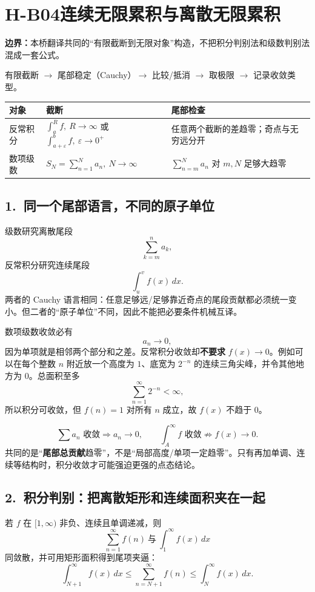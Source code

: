 \documentclass[UTF8,a4paper,10pt]{ctexart}
\begin{document}
\section*{H-B04\quad 连续无限累积与离散无限累积}
\textbf{边界：}本桥翻译共同的“有限截断到无限对象”构造，不把积分判别法和级数判别法混成一套公式。
\begin{tcolorbox}[title=共同骨架]
有限截断 $\longrightarrow$ 尾部稳定（Cauchy）$\longrightarrow$ 比较/抵消
$\longrightarrow$ 取极限 $\longrightarrow$ 记录收敛类型。
\end{tcolorbox}
\begin{tabularx}{\linewidth}{@{}lXX@{}}
\toprule
对象 & 截断 & 尾部检查\\ \midrule
反常积分 & $\int_a^R f,\ R\to\infty$ 或 $\int_{a+\varepsilon}^b f,\ \varepsilon\to0^+$ & 任意两个截断的差趋零；奇点与无穷远分开\\
数项级数 & $S_N=\sum_{n=1}^{N}a_n,\ N\to\infty$ & $\sum_{n=m}^{N}a_n$ 对 $m,N$ 足够大趋零\\
\bottomrule
\end{tabularx}
\subsection*{1.\ 同一个尾部语言，不同的原子单位}
级数研究离散尾段
\[
\sum_{k=m}^{n}a_k,
\]
反常积分研究连续尾段
\[
\int_u^v f(x)\,dx.
\]
两者的 Cauchy 语言相同：任意足够远/足够靠近奇点的尾段贡献都必须统一变小。但二者的“原子单位”不同，因此不能把必要条件机械互译。

数项级数收敛必有
\[
a_n\to0,
\]
因为单项就是相邻两个部分和之差。反常积分收敛却\textbf{不要求} $f(x)\to0$。例如可以在每个整数 $n$ 附近放一个高度为 $1$、底宽为 $2^{-n}$ 的连续三角尖峰，并令其他地方为 $0$。总面积至多
\[
\sum_{n=1}^{\infty}2^{-n}<\infty,
\]
所以积分可收敛，但 $f(n)=1$ 对所有 $n$ 成立，故 $f(x)$ 不趋于 $0$。

\begin{center}

\end{center}

\begin{tcolorbox}[title=核心 Anti-Bridge]
\[
\boxed{\sum a_n\text{ 收敛}\Rightarrow a_n\to0,
\qquad
\int_A^\infty f\text{ 收敛}\not\Rightarrow f(x)\to0.}
\]
共同的是“\textbf{尾部总贡献}趋零”，不是“局部高度/单项一定趋零”。只有再加单调、连续等结构时，积分收敛才可能强迫更强的点态结论。
\end{tcolorbox}

\subsection*{2.\ 积分判别：把离散矩形和连续面积夹在一起}
若 $f$ 在 $[1,\infty)$ 非负、连续且单调递减，则
\[
\sum_{n=1}^{\infty}f(n)\ \text{与}\ \int_1^\infty f(x)\,dx
\]
同敛散，并可用矩形面积得到尾项夹逼：
\[
\int_{N+1}^{\infty}f(x)\,dx
\le
\sum_{n=N+1}^{\infty}f(n)
\le
\int_N^{\infty}f(x)\,dx.
\]
\end{document}
